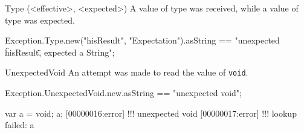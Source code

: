 \begin{urbiscriptapi}
\item[Type](<effective>, <expected>)%
  A value of type  was received, while a value of type
   was expected.
\begin{urbiassert}
Exception.Type.new("hisResult", "Expectation").asString
  == "unexpected \"hisResult\", expected a String";
\end{urbiassert}


\item[UnexpectedVoid]%
  An attempt was made to read the value of \lstinline|void|.
\begin{urbiassert}
Exception.UnexpectedVoid.new.asString
  == "unexpected void";
\end{urbiassert}
\begin{urbiscript}
var a = void;
a;
[00000016:error] !!! unexpected void
[00000017:error] !!! lookup failed: a
\end{urbiscript}
\end{urbiscriptapi}


